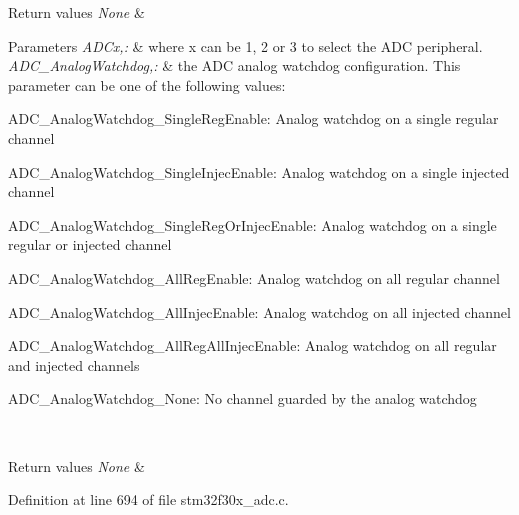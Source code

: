 \begin{DoxyRetVals}{Return values}
{\em None} & \\
\hline
\end{DoxyRetVals}

\begin{DoxyParams}{Parameters}
{\em A\-D\-Cx,\-:} & where x can be 1, 2 or 3 to select the A\-D\-C peripheral. \\
\hline
{\em A\-D\-C\-\_\-\-Analog\-Watchdog,\-:} & the A\-D\-C analog watchdog configuration. This parameter can be one of the following values\-: \begin{DoxyItemize}
\item A\-D\-C\-\_\-\-Analog\-Watchdog\-\_\-\-Single\-Reg\-Enable\-: Analog watchdog on a single regular channel \item A\-D\-C\-\_\-\-Analog\-Watchdog\-\_\-\-Single\-Injec\-Enable\-: Analog watchdog on a single injected channel \item A\-D\-C\-\_\-\-Analog\-Watchdog\-\_\-\-Single\-Reg\-Or\-Injec\-Enable\-: Analog watchdog on a single regular or injected channel \item A\-D\-C\-\_\-\-Analog\-Watchdog\-\_\-\-All\-Reg\-Enable\-: Analog watchdog on all regular channel \item A\-D\-C\-\_\-\-Analog\-Watchdog\-\_\-\-All\-Injec\-Enable\-: Analog watchdog on all injected channel \item A\-D\-C\-\_\-\-Analog\-Watchdog\-\_\-\-All\-Reg\-All\-Injec\-Enable\-: Analog watchdog on all regular and injected channels \item A\-D\-C\-\_\-\-Analog\-Watchdog\-\_\-\-None\-: No channel guarded by the analog watchdog \end{DoxyItemize}
\\
\hline
\end{DoxyParams}

\begin{DoxyRetVals}{Return values}
{\em None} & \\
\hline
\end{DoxyRetVals}


Definition at line 694 of file stm32f30x\-\_\-adc.\-c.


